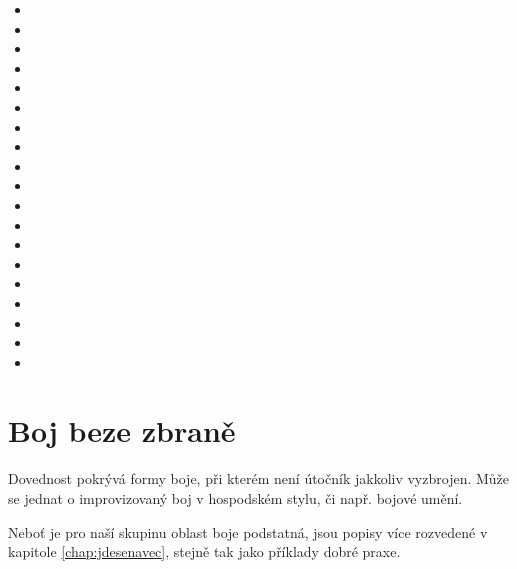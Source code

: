 \begin{multicols}{2}
\begin{itemize}
\item {}
\item {}
\item {}
\item {}
\item {}
\item {}
\item {}
\item {}
\item {}
\item {}
\item {}
\item {}
\item {}
\item {}
\item {}
\item {}
\item {}
\item {}
\item {}
\end{itemize}
\end{multicols}


\section{Boj beze zbraně}
\label{sec:bojbezezbrane}

Dovednost  pokrývá formy boje, při kterém není útočník jakkoliv vyzbrojen. Může se jednat o improvizovaný boj v hospodském stylu, či např. bojové umění.

Neboť je pro naší skupinu oblast boje podstatná, jsou popisy více rozvedené v kapitole \ref{chap:jdesenavec}, stejně tak jako příklady dobré praxe.\\
   
